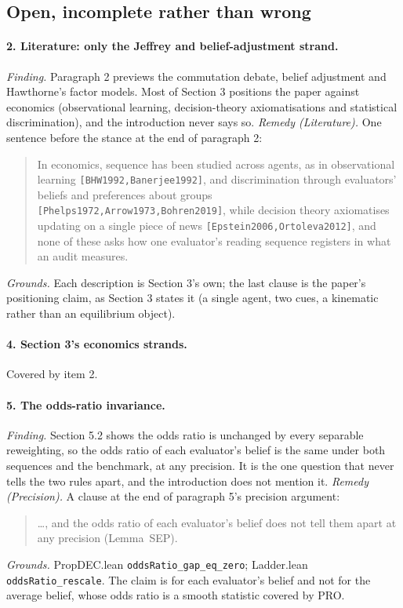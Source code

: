 \documentclass[11pt,a4paper]{article}
\newcommand{\citep}[1]{\texttt{[#1]}}
\begin{document}
\subsection*{Open, incomplete rather than wrong}

\paragraph{2. Literature: only the Jeffrey and belief-adjustment strand.}
\emph{Finding.} Paragraph 2 previews the commutation debate, belief adjustment and Hawthorne's
factor models. Most of Section 3 positions the paper against economics (observational learning,
decision-theory axiomatisations and statistical discrimination), and the introduction
never says so.
\emph{Remedy (Literature).} One sentence before the stance at the end of paragraph 2:
\begin{quote}
In economics, sequence has been studied across agents, as in observational learning
\citep{BHW1992,Banerjee1992}, and discrimination through evaluators' beliefs and preferences
about groups \citep{Phelps1972,Arrow1973,Bohren2019}, while decision theory axiomatises updating
on a single piece of news \citep{Epstein2006,Ortoleva2012}, and none of these asks how one
evaluator's reading sequence registers in what an audit measures.
\end{quote}
\emph{Grounds.} Each description is Section 3's own; the last clause is the paper's positioning
claim, as Section 3 states it (a single agent, two cues, a kinematic rather than an equilibrium
object).

\paragraph{4. Section 3's economics strands.} Covered by item 2.

\paragraph{5. The odds-ratio invariance.}
\emph{Finding.} Section 5.2 shows the odds ratio is unchanged by every separable reweighting, so
the odds ratio of each evaluator's belief is the same under both sequences and the benchmark, at
any precision. It is the one question that never tells the two rules apart, and the introduction
does not mention it.
\emph{Remedy (Precision).} A clause at the end of paragraph 5's precision argument:
\begin{quote}
\ldots, and the odds ratio of each evaluator's belief does not tell them apart at any precision
(Lemma~SEP).
\end{quote}
\emph{Grounds.} PropDEC.lean \texttt{oddsRatio\_gap\_eq\_zero}; Ladder.lean
\texttt{oddsRatio\_rescale}. The claim is for each evaluator's belief and not for the average
belief, whose odds ratio is a smooth statistic covered by PRO.
\end{document}
